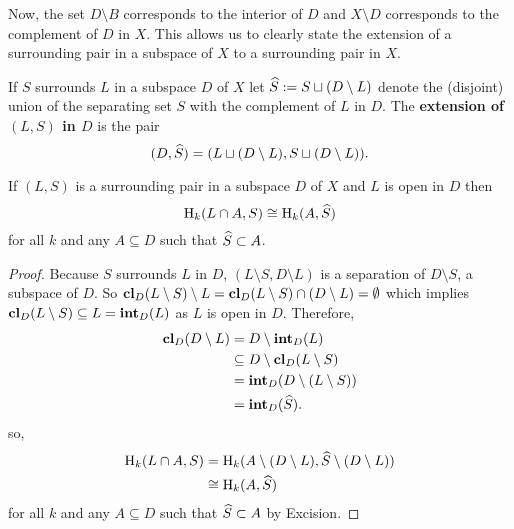Now, the set $D\setminus B$ corresponds to the interior of $D$ and $X\setminus D$ corresponds to the complement of $D$ in $X$.
This allows us to clearly state the extension of a surrounding pair in a subspace of $X$ to a surrounding pair in $X$.

\begin{definition}[Extension]
  If $S$ surrounds $L$ in a subspace $D$ of $X$ let $\widehat{S} := S\sqcup (D\setminus L)$ denote the (disjoint) union of the separating set $S$ with the complement of $L$ in $D$.
  The \textbf{extension of $(L, S)$ in $D$} is the pair
  \[ (D, \widehat{S}) = (L\sqcup (D\setminus L), S\sqcup (D\setminus L)).\]
\end{definition}

\begin{lemma}\label{lem:excision}
  If $(L, S)$ is a surrounding pair in a subspace $D$ of $X$ and $L$ is open in $D$ then
  \[ \mathrm{H}_k(L\cap A, S) \cong \mathrm{H}_k(A, \widehat{S}) \]
  for all $k$ and any $A\subseteq D$ such that $\widehat{S}\subset A$.
\end{lemma}
\begin{proof}
  Because $S$ surrounds $L$ in $D$, $(L\setminus S, D\setminus L)$ is a separation of $D\setminus S$, a subspace of $D$.
  So $\mathbf{cl}_D(L\setminus S)\setminus L = \mathbf{cl}_D(L\setminus S) \cap (D\setminus L) = \emptyset$ which implies $\mathbf{cl}_D(L\setminus S)\subseteq L = \mathbf{int}_D(L)$ as $L$ is open in $D$.
  Therefore,
  \begin{align*}
    \mathbf{cl}_D(D\setminus L) &= D\setminus \mathbf{int}_D(L)\\
                        &\subseteq D\setminus \mathbf{cl}_D(L\setminus S)\\
                        &= \mathbf{int}_D(D\setminus (L\setminus S))\\
                        &= \mathbf{int}_D(\widehat{S}).
  \end{align*}
  so,
  \begin{align*}
    \mathrm{H}_k(L\cap A, S) &= \mathrm{H}_k(A\setminus (D\setminus L), \widehat{S}\setminus (D\setminus L))\\
      &\cong \mathrm{H}_k(A, \widehat{S})
  \end{align*}
  for all $k$ and any $A\subseteq D$ such that $\widehat{S}\subset A$ by Excision.
\end{proof}
